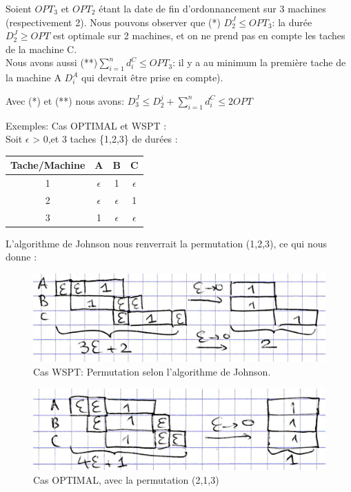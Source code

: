 \documentclass[12pt]{article}
\begin{document}
Soient $OPT_3$ et $OPT_2$ étant la date de fin d'ordonnancement sur 3 machines (respectivement 2). Nous pouvons observer que (*) $D_2^J \le OPT_3$: la durée $D_2^J \ge OPT$ est optimale sur 2 machines, et on ne prend pas en compte les taches de la machine C.\\

Nous avons aussi (**)$\displaystyle\sum_{i=1}^n d_i^C \le OPT_3$: il y a au minimum la première tache de la machine A $D_i^A$ qui devrait être prise en compte).\\
\begin{center}
Avec (*) et (**) nous avons:
$D_3^J \le D_2^j + \displaystyle\sum_{i=1}^n d_i^C \le 2OPT$ 
\end{center}
Exemples: Cas OPTIMAL et WSPT : \\ Soit $\epsilon$ > 0,et 3 taches \{1,2,3\} de durées :\\
\begin{center}
\begin{tabular}{|c|c|c|c|}

\hline 
Tache/Machine & A & B & C \\ 
\hline 
1 & $\epsilon$ & 1 & $\epsilon$ \\ 
\hline 
2 & $\epsilon$ & $\epsilon$ & 1 \\ 
\hline 
3 & 1 & $\epsilon$ & $\epsilon$ \\ 
\hline 
\end{tabular} 
\end{center}
L'algorithme de Johnson nous renverrait la permutation (1,2,3), ce qui nous donne :

\begin{figure}[!ht]
\centering
\centerline{\includegraphics[scale=1]{3.jpg}}
\caption{Cas WSPT: Permutation selon l'algorithme de Johnson.}
\label{wspt2}
\end{figure}

\begin{figure}[!ht]
\centering
\centerline{\includegraphics[scale=1]{4.jpg}}
\caption{Cas OPTIMAL, avec la permutation (2,1,3)}
\label{opt2}
\end{figure}
\end{document}
